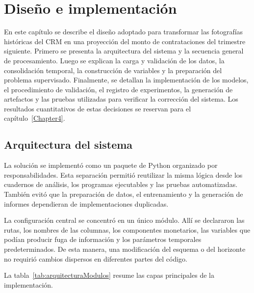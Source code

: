 
\chapter{Diseño e implementación}

\label{Chapter3}

En este capítulo se describe el diseño adoptado para transformar las fotografías históricas del CRM en una proyección del monto de contrataciones del trimestre siguiente. Primero se presenta la arquitectura del sistema y la secuencia general de procesamiento. Luego se explican la carga y validación de los datos, la consolidación temporal, la construcción de variables y la preparación del problema supervisado. Finalmente, se detallan la implementación de los modelos, el procedimiento de validación, el registro de experimentos, la generación de artefactos y las pruebas utilizadas para verificar la corrección del sistema. Los resultados cuantitativos de estas decisiones se reservan para el capítulo~\ref{Chapter4}.

\section{Arquitectura del sistema}
\label{sec:arquitecturaSistema}

La solución se implementó como un paquete de Python organizado por responsabilidades. Esta separación permitió reutilizar la misma lógica desde los cuadernos de análisis, los programas ejecutables y las pruebas automatizadas. También evitó que la preparación de datos, el entrenamiento y la generación de informes dependieran de implementaciones duplicadas.

La configuración central se concentró en un único módulo. Allí se declararon las rutas, los nombres de las columnas, los componentes monetarios, las variables que podían producir fuga de información y los parámetros temporales predeterminados. De esta manera, una modificación del esquema o del horizonte no requirió cambios dispersos en diferentes partes del código.

La tabla~\ref{tab:arquitecturaModulos} resume las capas principales de la implementación.


